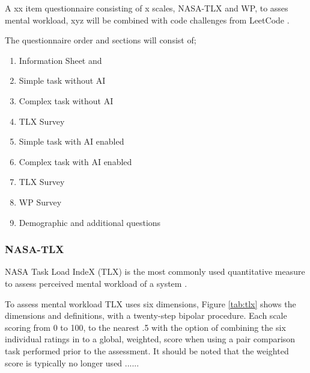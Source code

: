 \documentclass[man]{apa7}
\begin{document}
A xx item questionnaire consisting of x scales, NASA-TLX and WP, to asses mental workload, xyz will be combined with code challenges from LeetCode \parencite{ProblemsLeetCode}.


The questionnaire order and sections will consist of;
\begin{enumerate}
    \item Information Sheet and 
    \item Simple task without AI
    \item Complex task without AI
    \item TLX Survey
    \item Simple task with AI enabled
    \item Complex task with AI enabled
    \item TLX Survey
    \item WP Survey
    \item Demographic and additional questions
\end{enumerate}

\subsubsection{NASA-TLX}
NASA Task Load IndeX (TLX) \parencite{Hart1988DevelopmentResearch} is the most commonly used quantitative measure to assess perceived mental workload of a system \parencite{Longo2022HumanDefinition}. 

To assess mental workload TLX uses six dimensions, Figure \ref{tab:tlx} shows the dimensions and definitions, with a twenty-step bipolar procedure. Each scale scoring from 0 to 100, to the nearest .5 with the option of combining the six individual ratings in to a global, weighted, score when using a pair comparison task performed prior to the assessment. It should be noted that the weighted score is typically no longer used ......
\end{document}
